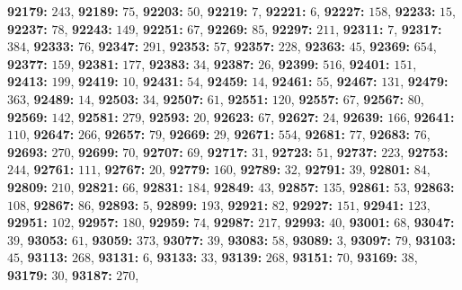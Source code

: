\textsf{\bfseries 92179:} $243$, \textsf{\bfseries 92189:} $75$, \textsf{\bfseries 92203:} $50$, \textsf{\bfseries 92219:} $7$, \textsf{\bfseries 92221:} $6$, \textsf{\bfseries 92227:} $158$, \textsf{\bfseries 92233:} $15$, \textsf{\bfseries 92237:} $78$, \textsf{\bfseries 92243:} $149$, \textsf{\bfseries 92251:} $67$, \textsf{\bfseries 92269:} $85$, \textsf{\bfseries 92297:} $211$, \textsf{\bfseries 92311:} $7$, \textsf{\bfseries 92317:} $384$, \textsf{\bfseries 92333:} $76$, \textsf{\bfseries 92347:} $291$, \textsf{\bfseries 92353:} $57$, \textsf{\bfseries 92357:} $228$, \textsf{\bfseries 92363:} $45$, \textsf{\bfseries 92369:} $654$, \textsf{\bfseries 92377:} $159$, \textsf{\bfseries 92381:} $177$, \textsf{\bfseries 92383:} $34$, \textsf{\bfseries 92387:} $26$, \textsf{\bfseries 92399:} $516$, \textsf{\bfseries 92401:} $151$, \textsf{\bfseries 92413:} $199$, \textsf{\bfseries 92419:} $10$, \textsf{\bfseries 92431:} $54$, \textsf{\bfseries 92459:} $14$, \textsf{\bfseries 92461:} $55$, \textsf{\bfseries 92467:} $131$, \textsf{\bfseries 92479:} $363$, \textsf{\bfseries 92489:} $14$, \textsf{\bfseries 92503:} $34$, \textsf{\bfseries 92507:} $61$, \textsf{\bfseries 92551:} $120$, \textsf{\bfseries 92557:} $67$, \textsf{\bfseries 92567:} $80$, \textsf{\bfseries 92569:} $142$, \textsf{\bfseries 92581:} $279$, \textsf{\bfseries 92593:} $20$, \textsf{\bfseries 92623:} $67$, \textsf{\bfseries 92627:} $24$, \textsf{\bfseries 92639:} $166$, \textsf{\bfseries 92641:} $110$, \textsf{\bfseries 92647:} $266$, \textsf{\bfseries 92657:} $79$, \textsf{\bfseries 92669:} $29$, \textsf{\bfseries 92671:} $554$, \textsf{\bfseries 92681:} $77$, \textsf{\bfseries 92683:} $76$, \textsf{\bfseries 92693:} $270$, \textsf{\bfseries 92699:} $70$, \textsf{\bfseries 92707:} $69$, \textsf{\bfseries 92717:} $31$, \textsf{\bfseries 92723:} $51$, \textsf{\bfseries 92737:} $223$, \textsf{\bfseries 92753:} $244$, \textsf{\bfseries 92761:} $111$, \textsf{\bfseries 92767:} $20$, \textsf{\bfseries 92779:} $160$, \textsf{\bfseries 92789:} $32$, \textsf{\bfseries 92791:} $39$, \textsf{\bfseries 92801:} $84$, \textsf{\bfseries 92809:} $210$, \textsf{\bfseries 92821:} $66$, \textsf{\bfseries 92831:} $184$, \textsf{\bfseries 92849:} $43$, \textsf{\bfseries 92857:} $135$, \textsf{\bfseries 92861:} $53$, \textsf{\bfseries 92863:} $108$, \textsf{\bfseries 92867:} $86$, \textsf{\bfseries 92893:} $5$, \textsf{\bfseries 92899:} $193$, \textsf{\bfseries 92921:} $82$, \textsf{\bfseries 92927:} $151$, \textsf{\bfseries 92941:} $123$, \textsf{\bfseries 92951:} $102$, \textsf{\bfseries 92957:} $180$, \textsf{\bfseries 92959:} $74$, \textsf{\bfseries 92987:} $217$, \textsf{\bfseries 92993:} $40$, \textsf{\bfseries 93001:} $68$, \textsf{\bfseries 93047:} $39$, \textsf{\bfseries 93053:} $61$, \textsf{\bfseries 93059:} $373$, \textsf{\bfseries 93077:} $39$, \textsf{\bfseries 93083:} $58$, \textsf{\bfseries 93089:} $3$, \textsf{\bfseries 93097:} $79$, \textsf{\bfseries 93103:} $45$, \textsf{\bfseries 93113:} $268$, \textsf{\bfseries 93131:} $6$, \textsf{\bfseries 93133:} $33$, \textsf{\bfseries 93139:} $268$, \textsf{\bfseries 93151:} $70$, \textsf{\bfseries 93169:} $38$, \textsf{\bfseries 93179:} $30$, \textsf{\bfseries 93187:} $270$, 
